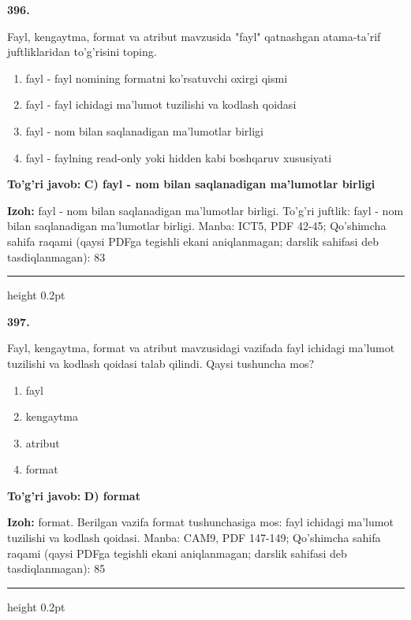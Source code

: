 \documentclass[10pt,a4paper]{article}
\begin{document}
{\bfseries\sffamily\color{ink} 396.}
\par
Fayl, kengaytma, format va atribut mavzusida "fayl" qatnashgan atama-ta'rif juftliklaridan to'g'risini toping.
\begin{enumerate}[label=\Alph*),leftmargin=9mm]
\item fayl - fayl nomining formatni ko'rsatuvchi oxirgi qismi
\item fayl - fayl ichidagi ma'lumot tuzilishi va kodlash qoidasi
\item fayl - nom bilan saqlanadigan ma'lumotlar birligi
\item fayl - faylning read-only yoki hidden kabi boshqaruv xususiyati
\end{enumerate}
\begin{tcolorbox}[enhanced,breakable,colback=teal!4,colframe=teal!60!black,boxrule=0.45pt,arc=1.2mm,left=2.7mm,right=2.7mm,top=1.8mm,bottom=1.8mm,before skip=2mm,after skip=2mm]
{\bfseries\sffamily\color{teal}To'g'ri javob:} \textbf{C) fayl - nom bilan saqlanadigan ma'lumotlar birligi}
\par\smallskip
{\bfseries Izoh:} fayl - nom bilan saqlanadigan ma'lumotlar birligi. To'g'ri juftlik: fayl - nom bilan saqlanadigan ma'lumotlar birligi. Manba: ICT5, PDF 42-45; Qo'shimcha sahifa raqami (qaysi PDFga tegishli ekani aniqlanmagan; darslik sahifasi deb tasdiqlanmagan): 83
\end{tcolorbox}
\vspace{2mm}\hrule height 0.2pt\vspace{3mm}

{\bfseries\sffamily\color{ink} 397.}
\par
Fayl, kengaytma, format va atribut mavzusidagi vazifada fayl ichidagi ma'lumot tuzilishi va kodlash qoidasi talab qilindi. Qaysi tushuncha mos?
\begin{enumerate}[label=\Alph*),leftmargin=9mm]
\item fayl
\item kengaytma
\item atribut
\item format
\end{enumerate}
\begin{tcolorbox}[enhanced,breakable,colback=teal!4,colframe=teal!60!black,boxrule=0.45pt,arc=1.2mm,left=2.7mm,right=2.7mm,top=1.8mm,bottom=1.8mm,before skip=2mm,after skip=2mm]
{\bfseries\sffamily\color{teal}To'g'ri javob:} \textbf{D) format}
\par\smallskip
{\bfseries Izoh:} format. Berilgan vazifa format tushunchasiga mos: fayl ichidagi ma'lumot tuzilishi va kodlash qoidasi. Manba: CAM9, PDF 147-149; Qo'shimcha sahifa raqami (qaysi PDFga tegishli ekani aniqlanmagan; darslik sahifasi deb tasdiqlanmagan): 85
\end{tcolorbox}
\vspace{2mm}\hrule height 0.2pt\vspace{3mm}
\end{document}
